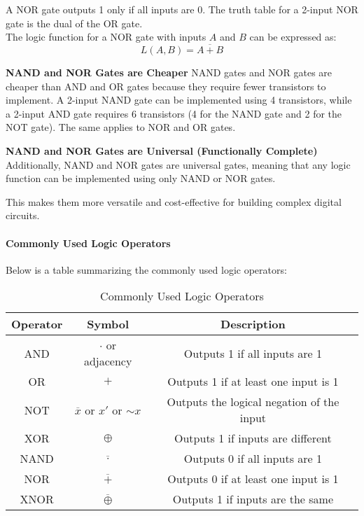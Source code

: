 \documentclass[11pt]{report}
\begin{document}
\begin{definition}
    A NOR gate outputs 1 only if all inputs are 0. The truth table for a 2-input NOR gate is the dual of the OR gate.
    \\
    The logic function for a NOR gate with inputs $A$ and $B$ can be expressed as:
    $$
        L(A, B) = \overline{A + B}
    $$
\end{definition}

\begin{shaded}
    \textbf{NAND and NOR Gates are Cheaper} NAND gates and NOR gates are cheaper than AND and OR gates because they require fewer transistors to implement. A 2-input NAND gate can be implemented using 4 transistors, while a 2-input AND gate requires 6 transistors (4 for the NAND gate and 2 for the NOT gate). The same applies to NOR and OR gates.

    \textbf{NAND and NOR Gates are Universal (Functionally Complete)} Additionally, NAND and NOR gates are universal gates, meaning that any logic function can be implemented using only NAND or NOR gates. 
    
    This makes them more versatile and cost-effective for building complex digital circuits.
\end{shaded}


\paragraph{Commonly Used Logic Operators} Below is a table summarizing the commonly used logic operators:
\begin{table}[h!]
    \centering
    \begin{tabular}{|c|c|c|}
        \hline
        Operator & Symbol & Description \\
        \hline
    AND & $\cdot$ or adjacency & Outputs 1 if all inputs are 1 \\
    OR & $+$ & Outputs 1 if at least one input is 1 \\
    NOT & $\overline{x}$ or $x'$ or $\sim x$ & Outputs the logical negation of the input \\
    XOR & $\oplus$ & Outputs 1 if inputs are different \\
        NAND & $\overline{\cdot}$ & Outputs 0 if all inputs are 1 \\
        NOR & $\overline{+}$ & Outputs 0 if at least one input is 1 \\
        XNOR & $\overline{\oplus}$ & Outputs 1 if inputs are the same \\
        \hline
    \end{tabular}
    \caption{Commonly Used Logic Operators}
\end{table}
\end{document}
